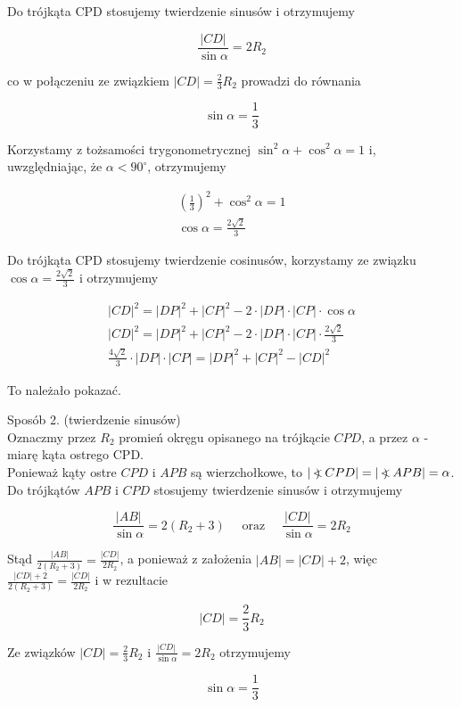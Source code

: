 \documentclass[10pt]{article}
\newcommand\Varangle{\mathop{{<\!\!\!\!\!\text{\small)}}\:}\nolimits}
\begin{document}
Do trójkąta CPD stosujemy twierdzenie sinusów i otrzymujemy

$$
\frac{|C D|}{\sin \alpha}=2 R_{2}
$$

co w połączeniu ze związkiem $|C D|=\frac{2}{3} R_{2}$ prowadzi do równania

$$
\sin \alpha=\frac{1}{3}
$$

Korzystamy z tożsamości trygonometrycznej $\sin ^{2} \alpha+\cos ^{2} \alpha=1$ i, uwzględniając, że $\alpha<90^{\circ}$, otrzymujemy

$$
\begin{gathered}
\left(\frac{1}{3}\right)^{2}+\cos ^{2} \alpha=1 \\
\cos \alpha=\frac{2 \sqrt{2}}{3}
\end{gathered}
$$

Do trójkąta CPD stosujemy twierdzenie cosinusów, korzystamy ze związku $\cos \alpha=\frac{2 \sqrt{2}}{3}$ i otrzymujemy

$$
\begin{gathered}
|C D|^{2}=|D P|^{2}+|C P|^{2}-2 \cdot|D P| \cdot|C P| \cdot \cos \alpha \\
|C D|^{2}=|D P|^{2}+|C P|^{2}-2 \cdot|D P| \cdot|C P| \cdot \frac{2 \sqrt{2}}{3} \\
\frac{4 \sqrt{2}}{3} \cdot|D P| \cdot|C P|=|D P|^{2}+|C P|^{2}-|C D|^{2}
\end{gathered}
$$

To należało pokazać.

Sposób 2. (twierdzenie sinusów)\\
Oznaczmy przez $R_{2}$ promień okręgu opisanego na trójkącie $C P D$, a przez $\alpha$ - miarę kąta ostrego CPD.\\
Ponieważ kąty ostre $C P D$ i $A P B$ są wierzchołkowe, to $|\Varangle C P D|=|\Varangle A P B|=\alpha$.\\
Do trójkątów $A P B$ i $C P D$ stosujemy twierdzenie sinusów i otrzymujemy

$$
\frac{|A B|}{\sin \alpha}=2\left(R_{2}+3\right) \quad \text { oraz } \quad \frac{|C D|}{\sin \alpha}=2 R_{2}
$$

Stąd $\frac{|A B|}{2\left(R_{2}+3\right)}=\frac{|C D|}{2 R_{2}}$, a ponieważ z założenia $|A B|=|C D|+2$, więc $\frac{|C D|+2}{2\left(R_{2}+3\right)}=\frac{|C D|}{2 R_{2}}$ i w rezultacie

$$
|C D|=\frac{2}{3} R_{2}
$$

Ze związków $|C D|=\frac{2}{3} R_{2}$ i $\frac{|C D|}{\sin \alpha}=2 R_{2}$ otrzymujemy

$$
\sin \alpha=\frac{1}{3}
$$
\end{document}
